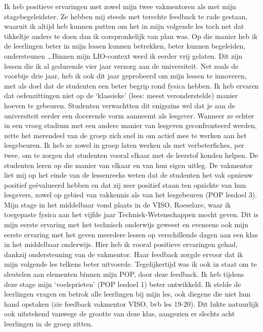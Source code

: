 \documentclass[a4paper,12pt,twoside]{article}%
\begin{document}
Ik heb positieve ervaringen met zowel mijn twee vakmentoren als met mijn stagebegeleidster. Ze hebben mij steeds met terechte feedback te rade gestaan, waaruit ik altijd heb kunnen putten om het in mijn volgende les toch net dat tikkeltje anders te doen dan ik oorspronkelijk van plan was. Op die manier heb ik de leerlingen beter in mijn lessen kunnen betrekken, beter kunnen begeleiden, ondersteunen \ldots Binnen mijn LIO-context werd ik eerder vrij gelaten. Dit zijn lessen die ik al gedurende vier jaar verzorg aan de universiteit. Net zoals de voorbije drie jaar, heb ik ook dit jaar geprobeerd om mijn lessen te innoveren, met als doel dat de studenten een beter begrip rond fysica hebben. Ik heb ervaren dat oefenzittingen niet op de `klassieke' (lees: meest veronderstelde) manier hoeven te gebeuren. Studenten verwachtten dit enigszins wel dat je aan de universiteit eerder een docerende vorm aanneemt als lesgever. Wanneer ze echter in een vroeg stadium met een andere manier van lesgeven geconfronteerd werden, zette het merendeel van de groep zich snel in om actief mee te werken aan het lesgebeuren. Ik heb ze zowel in groep laten werken als met verbeterfiches, per twee, om te zorgen dat studenten vooral elkaar met de leerstof konden helpen. De studenten leren op die manier van elkaar en van hun eigen uitleg. De vakmentor liet mij op het einde van de lessenreeks weten dat de studenten het vak opnieuw positief geëvalueerd hebben en dat zij zeer positief staan ten opzichte van hun lesgevers, zowel op gebied van vakkennis als van het lesgebeuren (POP lesdoel 3). \newline\newline
Mijn stage in het middelbaar vond plaats in de VISO, Roeselare, waar ik toegepaste fysica aan het vijfde jaar Techniek-Wetenschappen mocht geven. Dit is mijn eerste ervaring met het technisch onderwijs geweest en eveneens ook mijn eerste ervaring met het geven meerdere lessen op verschillende dagen aan een klas in het middelbaar onderwijs. Hier heb ik vooral positieve ervaringen gehad, dankzij ondersteuning van de vakmentor. Haar feedback zorgde ervoor dat ik mijn volgende les telkens beter uitvoerde. Tegelijkertijd was ik ook in staat om te sleutelen aan elementen binnen mijn POP, door deze feedback. Ik heb tijdens deze stage mijn `voelsprieten' (POP lesdoel 1) beter ontwikkeld. Ik stelde de leerlingen vragen en betrok alle leerlingen bij mijn les, ook diegene die niet hun hand opstaken (zie feedback vakmentor VISO, bvb les 19-20). Dit lukte natuurlijk ook uitstekend vanwege de grootte van deze klas, aangezien er slechts acht leerlingen in de groep zitten.  \newline
\end{document}
